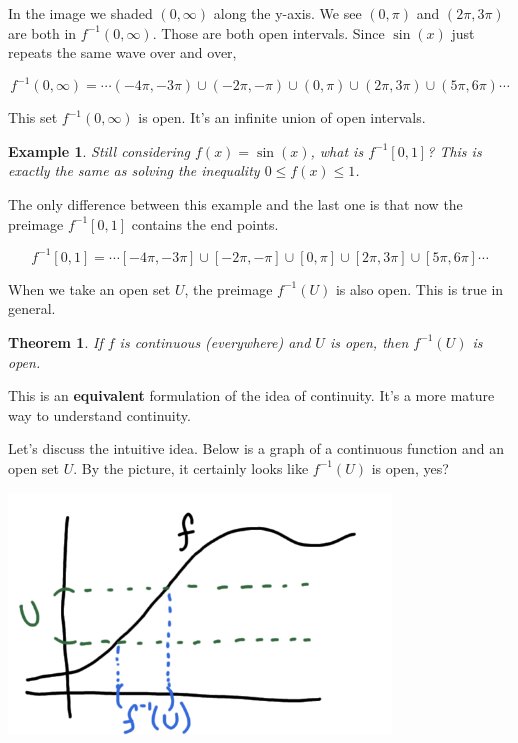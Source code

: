 \documentclass[11pt]{book}
\newtheorem{theorem}{Theorem}
\newtheorem{example}{Example}
\numberwithin{example}{chapter}
\begin{document}
In the image we shaded $(0,\infty)$ along the y-axis.  We see $(0,\pi)$ and $(2\pi,3\pi)$ are both in $f^{-1}(0,\infty)$.  Those are both open intervals.  Since $\sin(x)$ just repeats the same wave over and over, 

$$f^{-1}(0,\infty) = \cdots (-4\pi,-3\pi)\cup (-2\pi,-\pi) \cup  (0,\pi) \cup  (2\pi,3\pi) \cup  (5\pi,6\pi) \cdots $$

This set $f^{-1}(0,\infty)$ is open.  It's an infinite union of open intervals.  


\begin{example}
Still considering $f(x)=\sin(x)$, what is $f^{-1}[0,1]$?  This is exactly the same as solving the inequality $0\leq f(x) \leq 1$.  
\end{example}

The only difference between this example and the last one is that now the preimage $f^{-1}[0,1]$ contains the end points.  

$$f^{-1}[0,1] = \cdots [-4\pi,-3\pi]\cup [-2\pi,-\pi] \cup  [0,\pi] \cup  [2\pi,3\pi] \cup  [5\pi,6\pi] \cdots $$

When we take an open set $U$, the preimage $f^{-1}(U)$ is also open.  This is true in general.

\begin{theorem}
If $f$ is continuous (everywhere) and $U$ is open, then $f^{-1}(U)$ is open.
\end{theorem}

This is an \textbf{equivalent} formulation of the idea of continuity.  It's a more mature way to understand continuity.  


Let's discuss the intuitive idea.  Below is a graph of a continuous function and an open set $U$.  By the picture, it certainly looks like $f^{-1}(U)$ is open, yes?  

\begin{center}
\includegraphics[width=4in]{toplec1_4.png}
\end{center}
\end{document}
